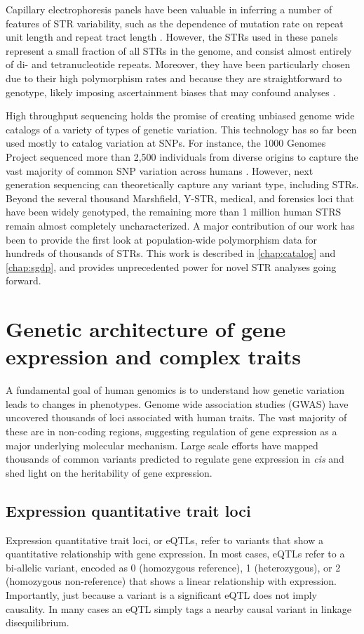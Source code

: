 Capillary electrophoresis panels have been valuable in inferring a number of features of STR variability, such as the dependence of mutation rate on repeat unit length \cite{JarveZhivotovskyRootsiEtAl2009} and repeat tract length \cite{SunHelgasonMassonEtAl2012}. However, the STRs used in these panels represent a small fraction of all STRs in the genome, and consist almost entirely of di- and tetranucleotide repeats. Moreover, they have been particularly chosen due to their high polymorphism rates and because they are straightforward to genotype, likely imposing ascertainment biases that may confound analyses \cite{ErikssonManicaScherer2011}.

High throughput sequencing holds the promise of creating unbiased genome wide catalogs of a variety of types of genetic variation. This technology has so far been used mostly to catalog variation at SNPs. For instance, the 1000 Genomes Project sequenced more than 2,500 individuals from diverse origins to capture the vast majority of common SNP variation across humans \cite{AbecasisAltshulerAutonEtAl2010}. However, next generation sequencing can theoretically capture any variant type, including STRs. Beyond the several thousand Marshfield, Y-STR, medical, and forensics loci that have been widely genotyped, the remaining more than 1 million human STRS remain almost completely uncharacterized. A major contribution of our work has been to provide the first look at population-wide polymorphism data for hundreds of thousands of STRs. This work is described in \autoref{chap:catalog} and \autoref{chap:sgdp}, and provides unprecedented power for novel STR analyses going forward.

\section{Genetic architecture of gene expression and complex traits}
\label{sec:introarch}

A fundamental goal of human genomics is to understand how genetic variation leads to changes in phenotypes. Genome wide association studies (GWAS) have uncovered thousands of loci associated with human traits. The vast majority of these are in non-coding regions, suggesting regulation of gene expression as a major underlying molecular mechanism. Large scale efforts have mapped thousands of common variants predicted to regulate gene expression in \emph{cis} and shed light on the heritability of gene expression.

\subsection{Expression quantitative trait loci}
Expression quantitative trait loci, or eQTLs, refer to variants that show a quantitative relationship with gene expression. In most cases, eQTLs refer to a bi-allelic variant, encoded as 0 (homozygous reference), 1 (heterozygous), or 2 (homozygous non-reference) that shows a linear relationship with expression. Importantly, just because a variant is a significant eQTL does not imply causality. In many cases an eQTL simply tags a nearby causal variant in linkage disequilibrium.


